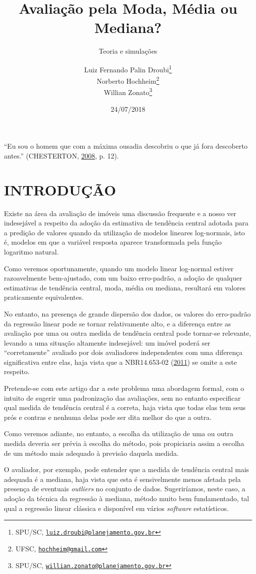 \documentclass[a4paper, 12pt]{article}
\title{Avaliação pela Moda, Média ou Mediana?}
\subtitle{Teoria e simulações}
\author{Luiz Fernando Palin Droubi\footnote{SPU/SC,
  \href{mailto:luiz.droubi@planejamento.gov.br}{\nolinkurl{luiz.droubi@planejamento.gov.br}}} \\ Norberto Hochheim\footnote{UFSC,
  \href{mailto:hochheim@gmail.com}{\nolinkurl{hochheim@gmail.com}}} \\ Willian Zonato\footnote{SPU/SC,
  \href{mailto:willian.zonato@planejamento.gov.br}{\nolinkurl{willian.zonato@planejamento.gov.br}}}}
\date{24/07/2018}
\begin{document}
\maketitle

``Eu sou o homem que com a máxima ousadia descobriu o que já fora
descoberto antes.'' (CHESTERTON,
\protect\hyperlink{ref-gkchesterton}{2008}, p. 12).

\section{INTRODUÇÃO}\label{introducao}

Existe na área da avaliação de imóveis uma discussão frequente e a nosso
ver indesejável a respeito da adoção da estimativa de tendência central
adotada para a predição de valores quando da utilização de modelos
lineares log-normais, isto é, modelos em que a variável resposta aparece
transformada pela função logaritmo natural.

Como veremos oportunamente, quando um modelo linear log-normal estiver
razoavelmente bem-ajustado, com um baixo erro-padrão, a adoção de
qualquer estimativas de tendência central, moda, média ou mediana,
resultará em valores praticamente equivalentes.

No entanto, na presença de grande dispersão dos dados, os valores do
erro-padrão da regressão linear pode se tornar relativamente alto, e a
diferença entre as avaliação por uma ou outra medida de tendência
central pode tornar-se relevante, levando a uma situação altamente
indesejável: um imóvel poderá ser ``corretamente'' avaliado por dois
avaliadores independentes com uma diferença significativa entre elas,
haja vista que a NBR14.653-02 (\protect\hyperlink{ref-NBR1465302}{2011})
se omite a este respeito.

Pretende-se com este artigo dar a este problema uma abordagem formal,
com o intuito de sugerir uma padronização das avaliações, sem no entanto
especificar qual medida de tendência central é a correta, haja vista que
todas elas tem seus prós e contras e nenhuma delas pode ser dita melhor
do que a outra.

Como veremos adiante, no entanto, a escolha da utilização de uma ou
outra medida deveria ser prévia à escolha do método, pois propiciaria
assim a escolha de um método mais adequado à previsão daquela medida.

O avaliador, por exemplo, pode entender que a medida de tendência
central mais adequada é a mediana, haja vista que esta é sensivelmente
menos afetada pela presença de eventuais \emph{outliers} no conjunto de
dados. Sugeriríamos, neste caso, a adoção da técnica da regressão à
mediana, método muito bem fundamentado, tal qual a regressão linear
clássica e disponível em vários \emph{software} estatísticos.
\end{document}
